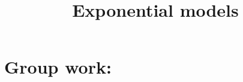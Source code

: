 \documentclass[]{ximera}
\title{Exponential models}
\begin{document}
\begin{abstract}		\end{abstract}
\maketitle



\begin{comment}
\section{Warm up:}

	\begin{freeResponse}
	
	\end{freeResponse}
	
\begin{instructorNotes}

\end{instructorNotes}
\end{comment}







\section{Group work:}
\end{document}
